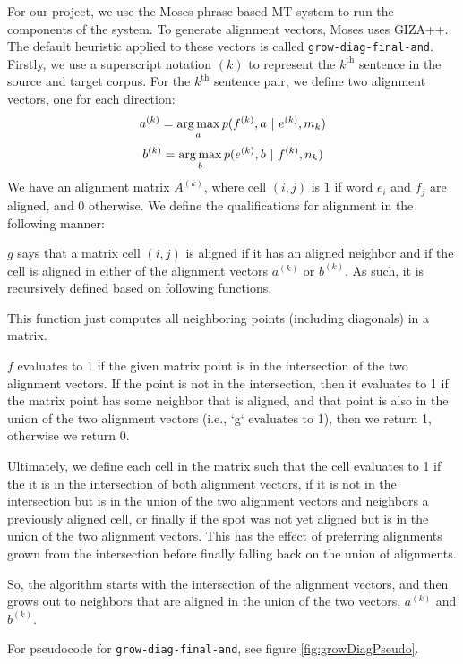 \documentclass[twocolumn]{article}
\newcommand{\originalAlign}{\texttt{grow-diag-final-and}}
\begin{document}
For our project, we use the Moses phrase-based MT system to run the components
of the system. To generate alignment vectors, Moses uses GIZA++. The default
heuristic applied to these vectors is called \originalAlign{}.
Firstly, we use a superscript notation $(k)$ to represent the $k^{\text{th}}$
sentence in the source and target corpus.
For the $k^{\text{th}}$ sentence pair, we define two alignment vectors, one for
each direction:
\[ a^{(k)} = \argmax_a p(f^{(k)}, a\ |\ e^{(k)}, m_k) \]
\[ b^{(k)} = \operatorname*{arg\,max}_b p(e^{(k)}, b\ |\ f^{(k)}, n_k) \]
We have an alignment matrix $A^{(k)}$, where cell $(i,j)$ is $1$ if word $e_i$
and $f_j$ are aligned, and $0$ otherwise.
We define the qualifications for alignment in the following manner:

$g$ says that a matrix cell $(i,j)$ is aligned if it has an aligned
neighbor and if the cell is aligned in either of the alignment vectors
$a^{(k)}$ or $b^{(k)}$.
As such, it is recursively defined based on following functions.
\wrapSmall{\isAlignedFromGrow{}}


This function just computes all neighboring points (including diagonals) in a
matrix.
\wrapSmall{\neighborsFunc{}}

$f$ evaluates to 1 if the given matrix point is in the
intersection of the two alignment vectors.
If the point is not in the intersection, then it evaluates to 1
if the matrix point has some neighbor that is aligned, and that point is also
in the union of the two alignment vectors (i.e., `g` evaluates to 1), then
we return 1, otherwise we return 0.
\wrapSmall{\isAlignedFromInterOrGrow{}}

Ultimately, we define each cell in the matrix such that
the cell evaluates to 1 if the it is in the
intersection of both alignment vectors, if it is not in the intersection but is
in the union of the two alignment vectors and neighbors a previously aligned
cell, or finally if the spot was not yet aligned but is in the union of the two
alignment vectors. This has the effect of preferring alignments grown from the
intersection before finally falling back on the union of alignments.
\wrapSmall{\growDiagMatrix{}}


So, the algorithm starts with the intersection of the alignment vectors, and
then grows out to neighbors that are aligned in the union of the two vectors,
$a^{(k)}$ and $b^{(k)}$.

For pseudocode for \originalAlign{}, see figure \ref{fig:growDiagPseudo}.
\end{document}
